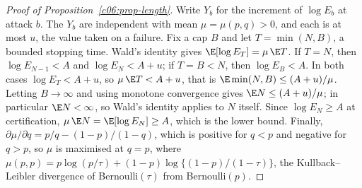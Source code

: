\begin{proof}[Proof of Proposition~\ref{c06:prop-length}]
Write $Y_b$ for the increment of $\log E_b$ at attack $b$. The $Y_b$ are independent
with mean $\mu = \mu(p,q) > 0$, and each is at most $u$, the value taken on a
failure. Fix a cap $B$ and let $T = \min(N, B)$, a bounded stopping time. Wald's
identity gives $\E[\log E_T] = \mu\,\E T$. If $T = N$, then $\log E_{N-1} < A$ and
$\log E_N < A + u$; if $T = B < N$, then $\log E_B < A$. In both cases
$\log E_T < A + u$, so $\mu\,\E T < A + u$, that is $\E\min(N,B) \le (A+u)/\mu$.
Letting $B \to \infty$ and using monotone convergence gives $\E N \le (A+u)/\mu$; in
particular $\E N < \infty$, so Wald's identity applies to $N$ itself. Since
$\log E_N \ge A$ at certification, $\mu\,\E N = \E[\log E_N] \ge A$, which is the
lower bound. Finally, $\partial \mu / \partial q = p/q - (1-p)/(1-q)$, which is
positive for $q < p$ and negative for $q > p$, so $\mu$ is maximised at $q = p$,
where $\mu(p,p) = p\log(p/\tau) + (1-p)\log\{(1-p)/(1-\tau)\}$, the
Kullback--Leibler divergence of Bernoulli$(\tau)$ from Bernoulli$(p)$.
\end{proof}
